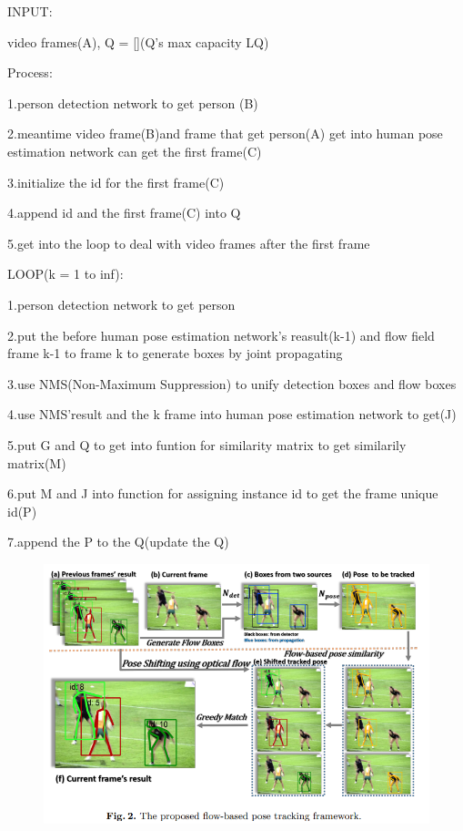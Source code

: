 \documentclass[11pt]{article}
\begin{document}
INPUT:

video frames(A), Q = [](Q's max capacity LQ)

Process:

1.person detection network to get person (B)

2.meantime video frame(B)and frame that get person(A) get into human pose estimation network can get the first frame(C)

3.initialize the id for the first frame(C)

4.append id and the first frame(C) into Q

5.get into the loop to deal with video frames after the first frame

LOOP(k = 1 to inf):

1.person detection network to get person

2.put the before human pose estimation network's reasult(k-1) and flow field frame k-1 to frame k to generate boxes by joint propagating

3.use NMS(Non-Maximum Suppression) to unify detection boxes and flow boxes

4.use NMS'result and the k frame into human pose estimation network to get(J)

5.put G and Q to get into funtion for similarity matrix to get similarily matrix(M)

6.put M and J into function for assigning instance id to get the frame unique id(P)

7.append the P to the Q(update the Q)

\begin{figure}[h]
	\centering
	\includegraphics[scale = 0.5]{2}
\end{figure}
\end{document}
